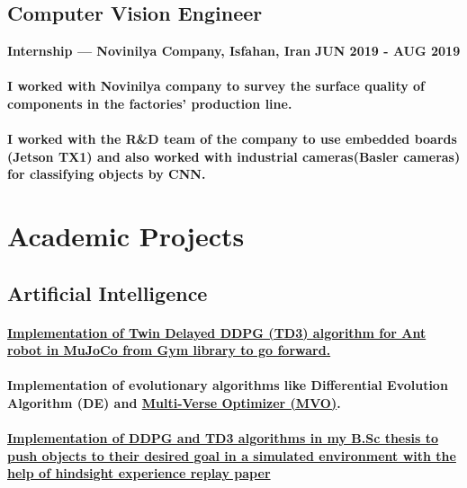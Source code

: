 \documentclass[a4paper]{article}
\begin{document}
        \subsection{Computer Vision Engineer}
        {\bfseries\small Internship — Novinilya Company, Isfahan, Iran}
        \hfill
        {\bfseries\small JUN 2019 - AUG 2019}\nopagebreak
        
        \paragraph{I worked with Novinilya company to survey the surface quality of components in the factories'  production line.}
        \paragraph{I worked with the R\&D team of the company to use embedded boards (Jetson TX1) and also worked with industrial cameras(Basler cameras) for classifying objects by CNN.}

    \section{Academic Projects}

        \subsection{Artificial Intelligence}

            \paragraph{\href{https://github.com/ake1999/TD3_Ant_v4}{Implementation of Twin Delayed DDPG (TD3) algorithm for Ant robot in MuJoCo from Gym library to go forward.}}
            \paragraph{Implementation of evolutionary algorithms like Differential Evolution Algorithm (DE) and \href{https://github.com/ake1999/MVO_MATLAB}{Multi-Verse Optimizer (MVO)}.}
            \paragraph{\href{https://github.com/ake1999/aarm}{Implementation of DDPG and TD3 algorithms in my B.Sc thesis to push objects to their desired goal in a simulated environment with the help of hindsight experience replay paper}}
\end{document}
